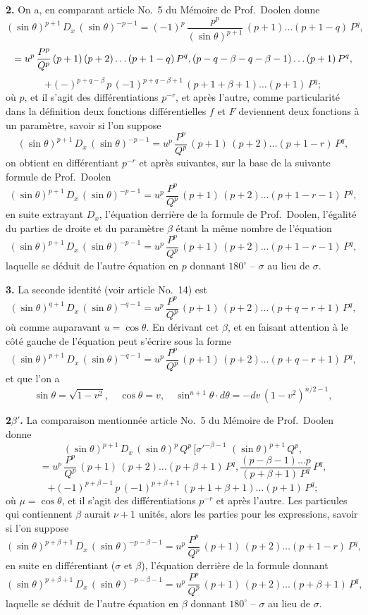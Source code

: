 \documentclass[11pt,a4paper]{book}
\begin{document}
\setcounter{page}{136}

\textbf{2.} On a, en comparant article No.~5 du Mémoire de Prof.~Doolen donne
\[
(\sin\theta)^{p+1}\,D_x\,(\sin\theta)^{-p-1} = (-1)^p\,\frac{p^p}{(\sin\theta)^{p+1}}\,(p+1)\ldots(p+1-q)\,P^q,
\]
\[
= u^p\,\frac{P^p}{Q^p}\,(p+1)\,(p+2)\ldots(p+1-q)\,P^q,\\(p-q-\beta-q-\beta-1)\ldots(p+1)\,P^q,
\]
\[
+(-)^{p+q-\beta}\,p\,(-1)^{p+q-\beta+1}\,(p+1+\beta+1)\ldots(p+1)\,P^q;
\]
où $p$, et il s'agit des différentiations $p^{-r}$, et après l'autre, comme particularité dans la définition deux fonctions différentielles $f$ et $F$ deviennent deux fonctions à un paramètre, savoir si l'on suppose
\[
(\sin\theta)^{p+1}\,D_x\,(\sin\theta)^{-p-1} = u^p\,\frac{P^p}{Q^p}\,(p+1)\,(p+2)\ldots(p+1-r)\,P^q,
\]
on obtient en différentiant $p^{-r}$ et après suivantes, sur la base de la suivante formule de Prof.~Doolen
\[
(\sin\theta)^{p+1}\,D_x\,(\sin\theta)^{-p-1} = u^p\,\frac{P^p}{Q^p}\,(p+1)\,(p+2)\ldots(p+1-r-1)\,P^q,
\]
en suite extrayant $D_x$, l'équation derrière de la formule de Prof.~Doolen, l'égalité du parties de droite et du paramètre $\beta$ étant la même nombre de l'équation
\[
(\sin\theta)^{p+1}\,D_x\,(\sin\theta)^{-p-1} = u^p\,\frac{P^p}{Q^p}\,(p+1)\,(p+2)\ldots(p+1-r-1)\,P^q,
\]
laquelle se déduit de l'autre équation en $p$ donnant $180^\circ$ -- $\sigma$ au lieu de $\sigma$.

\textbf{3.} La seconde identité (voir article No.~14) est
\[
(\sin\theta)^{q+1}\,D_x\,(\sin\theta)^{-q-1} = u^p\,\frac{P^p}{Q^p}\,(p+1)\,(p+2)\ldots(p+q-r+1)\,P^q,
\]
où comme auparavant $u = \cos\theta$. En dérivant cet $\beta$, et en faisant attention à le côté gauche de l'équation peut s'écrire sous la forme
\[
(\sin\theta)^{p+1}\,D_x\,(\sin\theta)^{-q-1} = u^p\,\frac{P^p}{Q^p}\,(p+1)\,(p+2)\ldots(p+q-r+1)\,P^q,
\]
et que l'on a
\[
\sin\theta = \sqrt{1-v^2},\quad \cos\theta = v,\quad \sin^{n+1}\theta\cdot d\theta = -dv\,(1-v^2)^{n/2-1},
\]

\setcounter{page}{137}

\textbf{2$\beta'$.} La comparaison mentionnée article No.~5 du Mémoire de Prof.~Doolen donne
\[
(\sin\theta)^{p+1}\,D_x\,(\sin\theta)^{p}\,Q^p\,[\sigma'^{-\beta-1}\,\,(\sin\theta)^{p+1}\,Q^p,
\]
\[
= u^p\,\frac{P^p}{Q^p}\,(p+1)\,(p+2)\ldots(p+\beta+1)\,P^q,\frac{(p-\beta-1)\ldots p}{(p+\beta+1)\,P^q}\,P^q,
\]
\[
+ (-1)^{p+\beta-1}\,p\,(-1)^{p+\beta+1}\,(p+1+\beta+1)\ldots(p+1)\,P^q;
\]
où $\mu = \cos\theta$, et il s'agit des différentiations $p^{-r}$ et après l'autre. Les particules qui contiennent $\beta$ aurait $\nu+1$ unités, alors les parties pour les expressions, savoir si l'on suppose
\[
(\sin\theta)^{p+\beta+1}\,D_x\,(\sin\theta)^{-p-\beta-1} = u^p\,\frac{P^p}{Q^p}\,(p+1)\,(p+2)\ldots(p+1-r)\,P^q,
\]
en suite en différentiant ($\sigma$ et $\beta$), l'équation derrière de la formule donnant
\[
(\sin\theta)^{p+\beta+1}\,D_x\,(\sin\theta)^{-p-\beta-1} = u^p\,\frac{P^p}{Q^p}\,(p+1)\,(p+2)\ldots(p+\beta+1)\,P^q,
\]
laquelle se déduit de l'autre équation en $\beta$ donnant $180^\circ$ -- $\sigma$ au lieu de $\sigma$.
\end{document}
